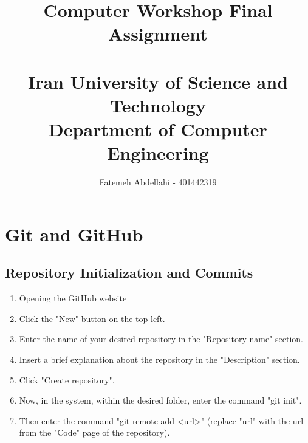 \documentclass[12pt]{article}
\title{
    \vspace{2in}
    \textbf{Computer Workshop Final Assignment}\\
    \textbf{ }\\
    \large Iran University of Science and Technology\\
    \large Department of Computer Engineering\\
    \vspace{2in}
}
\author{
    \vspace{0.5in}
    Fatemeh Abdellahi - 401442319\\
    \vspace{0.5in}
}
\begin{document}
\begin{titlepage}
    \maketitle
    \thispagestyle{empty}
\end{titlepage}

\tableofcontents
\newpage

\titleformat{\section}[block]{\bfseries\Large\filcenter}{\thesection}{1em}{}
\titleformat{\subsection}[block]{\bfseries\large}{\thesubsection}{1em}{}
\titleformat{\subsubsection}[block]{\bfseries\normalsize}{\thesubsubsection}{1em}{}
\newpage

\section{Git and GitHub}
\subsection{Repository Initialization and Commits}
\begin{enumerate}[label=\arabic*.]
    \item Opening the GitHub website
    \item Click the "New" button on the top left.
    \item Enter the name of your desired repository in the "Repository name" section.
    \item Insert a brief explanation about the repository in the "Description" section.
    \item Click "Create repository".
    \item Now, in the system, within the desired folder, enter the command "git init".
    \item Then enter the command "git remote add <url>" (replace "url" with the url from the "Code" page of the repository).
\end{enumerate}
\end{document}
